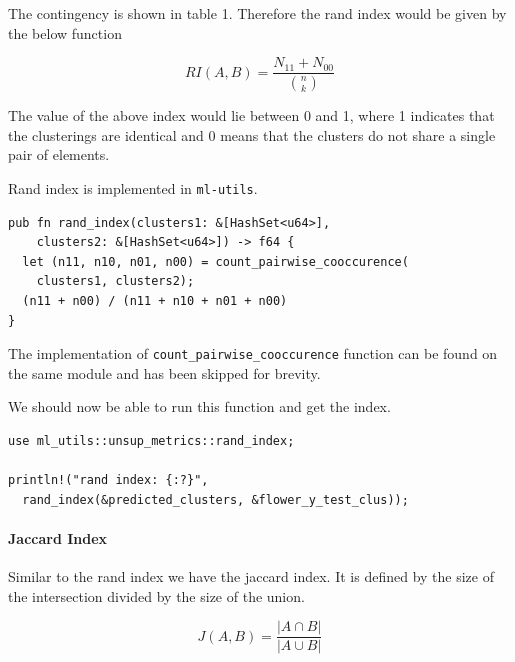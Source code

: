 \documentclass{book}
\begin{document}
The contingency is shown in table 1. Therefore the rand index would be given by the below function

\begin{equation}
	RI(A, B) = \frac{N_{11} + N_{00}}{\binom nk}
\end{equation}

The value of the above index would lie between 0 and 1, where 1 indicates that the clusterings are identical and 0 means that the clusters do not share a single pair of elements.

Rand index is implemented in \lstinline{ml-utils}.

\begin{lstlisting}[caption={ml\\-utils\\/src\\/unsup\_metrics\\.rs}]
pub fn rand_index(clusters1: &[HashSet<u64>],
    clusters2: &[HashSet<u64>]) -> f64 {
  let (n11, n10, n01, n00) = count_pairwise_cooccurence(
    clusters1, clusters2);
  (n11 + n00) / (n11 + n10 + n01 + n00)
}
\end{lstlisting}

The implementation of \lstinline{count_pairwise_cooccurence} function can be found on the same module and has been skipped for brevity.

We should now be able to run this function and get the index.

\begin{lstlisting}[caption={ml\\-utils\\/src\\/unsup\_metrics\\.rs}]
use ml_utils::unsup_metrics::rand_index;

println!("rand index: {:?}",
  rand_index(&predicted_clusters, &flower_y_test_clus));
\end{lstlisting}

\label{par:rand_index}

\paragraph{Jaccard Index}%
Similar to the rand index we have the jaccard index. It is defined by the size of the intersection divided by the size of the union.

\begin{equation}
	J(A, B) = \frac{|A \cap B|}{|A \cup B|}
\end{equation}
\end{document}
